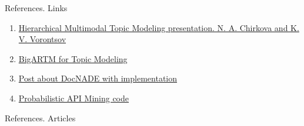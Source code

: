 \documentclass[10pt,aspectratio=1610]{beamer}
\begin{document}
\begin{frame}{References. Links}
  \begin{enumerate}
    \item \href{http://www.machinelearning.ru/wiki/images/d/dc/2.Chirkova.pdf}{Hierarchical Multimodal Topic Modeling presentation. N. A. Chirkova and K. V. Vorontsov}
    \item \href{http://bigartm.org}{BigARTM for Topic Modeling}
    \item \href{http://blog.aylien.com/tensorflow-implementation-neural-autoregressive-topic-model-docnade/}{Post about DocNADE with implementation}
    \item \href{https://github.com/mast-group/api-mining}{Probabilistic API Mining code}


  \end{enumerate}

\end{frame}

\begin{frame}[allowframebreaks]{References. Articles}

  
  

\end{frame}
\end{document}
